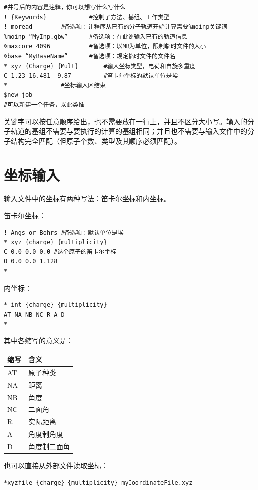 \documentclass{ctexart}
\begin{document}
	\begin{lstlisting}
#井号后的内容是注释，你可以想写什么写什么
! {Keywords} 			#控制了方法、基组、工作类型
! moread 		#备选项：让程序从已有的分子轨道开始计算需要%moinp关键词
%moinp “MyInp.gbw” 		#备选项：在此处输入已有的轨道信息
%maxcore 4096 			#备选项：以MB为单位，限制临时文件的大小
%base “MyBaseName” 		#备选项：规定临时文件的文件名
* xyz {Charge} {Mult} 		#输入坐标类型，电荷和自旋多重度
C 1.23 16.481 -9.87 		#笛卡尔坐标的默认单位是埃
* 				#坐标输入区结束
$new_job
#可以新建一个任务，以此类推
	\end{lstlisting}
	
	关键字可以按任意顺序给出，也不需要放在一行上，并且不区分大小写。输入的分子轨道的基组不需要与要执行的计算的基组相同；并且也不需要与输入文件中的分子结构完全匹配（但原子个数、类型及其顺序必须匹配）。
	
	\section{坐标输入}
	输入文件中的坐标有两种写法：笛卡尔坐标和内坐标。
	
	笛卡尔坐标：
	\begin{lstlisting}
! Angs or Bohrs #备选项：默认单位是埃
* xyz {charge} {multiplicity}
C 0.0 0.0 0.0 #这个原子的笛卡尔坐标
O 0.0 0.0 1.128
*
	\end{lstlisting}
	
	内坐标：
	\begin{lstlisting}
* int {charge} {multiplicity}
AT NA NB NC R A D 
*
	\end{lstlisting}
	
	其中各缩写的意义是：
	
\begin{table}[H]
	\centering
	\begin{tabular}{ll}
		\toprule
		\textbf{缩写} & \textbf{含义}     \\
		\midrule
		AT & 原子种类   \\
		NA & 距离     \\
		NB & 角度     \\
		NC & 二面角    \\
		R  & 实际距离   \\
		A  & 角度制角度  \\
		D  & 角度制二面角\\
		\bottomrule
	\end{tabular}
\end{table}
	
	也可以直接从外部文件读取坐标：
	\begin{lstlisting}
*xyzfile {charge} {multiplicity} myCoordinateFile.xyz
	\end{lstlisting}
	
\end{document}
